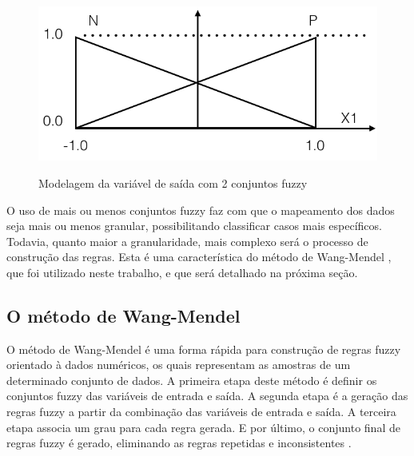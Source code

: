 \documentclass[template.tex]{subfiles}
\begin{document}
\begin{figure}[H]
\caption{Modelagem da variável de saída com 2 conjuntos fuzzy}
\centering
\includegraphics[scale=0.45]{conjuntos_fuzzy_saida.png}
\label{figura:conjuntos_fuzzy_saida}
\end{figure}

O uso de mais ou menos conjuntos fuzzy faz com que o mapeamento dos dados seja mais ou menos granular, possibilitando classificar casos mais específicos. Todavia, quanto maior a granularidade, mais complexo será o processo de construção das regras. Esta é uma característica do método de Wang-Mendel \cite{wang1992generating}, que foi utilizado neste trabalho, e que será detalhado na próxima seção.


\subsection{O método de Wang-Mendel}

O método de Wang-Mendel é uma forma rápida para construção de regras fuzzy orientado à dados numéricos, os quais representam as amostras de um determinado conjunto de dados. A primeira etapa deste método é definir os conjuntos fuzzy das variáveis de entrada e saída. A segunda etapa é a geração das regras fuzzy a partir da combinação das variáveis de entrada e saída. A terceira etapa associa um grau para cada regra gerada. E por último, o conjunto final de regras fuzzy é gerado, eliminando as regras repetidas e inconsistentes \cite{wang1992generating}.

\end{document}
